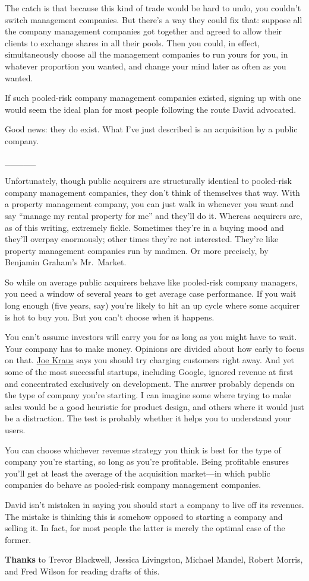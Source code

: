 The catch is that because this kind of trade would be hard to undo, you
couldn't switch management companies. But there's a way they could fix
that: suppose all the company management companies got together and
agreed to allow their clients to exchange shares in all their pools.
Then you could, in effect, simultaneously choose all the management
companies to run yours for you, in whatever proportion you wanted, and
change your mind later as often as you wanted.

If such pooled-risk company management companies existed, signing up
with one would seem the ideal plan for most people following the route
David advocated.

Good news: they do exist. What I've just described is an acquisition by
a public company.

\_\_\_\_\_

Unfortunately, though public acquirers are structurally identical to
pooled-risk company management companies, they don't think of themselves
that way. With a property management company, you can just walk in
whenever you want and say ``manage my rental property for me'' and
they'll do it. Whereas acquirers are, as of this writing, extremely
fickle. Sometimes they're in a buying mood and they'll overpay
enormously; other times they're not interested. They're like property
management companies run by madmen. Or more precisely, by Benjamin
Graham's Mr.~Market.

So while on average public acquirers behave like pooled-risk company
managers, you need a window of several years to get average case
performance. If you wait long enough (five years, say) you're likely to
hit an up cycle where some acquirer is hot to buy you. But you can't
choose when it happens.

You can't assume investors will carry you for as long as you might have
to wait. Your company has to make money. Opinions are divided about how
early to focus on that.
\href{http://susanitsa.wordpress.com/2006/11/08/the-joe-kraus-qa-better-late/}{Joe
Kraus} says you should try charging customers right away. And yet some
of the most successful startups, including Google, ignored revenue at
first and concentrated exclusively on development. The answer probably
depends on the type of company you're starting. I can imagine some where
trying to make sales would be a good heuristic for product design, and
others where it would just be a distraction. The test is probably
whether it helps you to understand your users.

You can choose whichever revenue strategy you think is best for the type
of company you're starting, so long as you're profitable. Being
profitable ensures you'll get at least the average of the acquisition
market---in which public companies do behave as pooled-risk company
management companies.

David isn't mistaken in saying you should start a company to live off
its revenues. The mistake is thinking this is somehow opposed to
starting a company and selling it. In fact, for most people the latter
is merely the optimal case of the former.

\textbf{Thanks} to Trevor Blackwell, Jessica Livingston, Michael Mandel,
Robert Morris, and Fred Wilson for reading drafts of this.